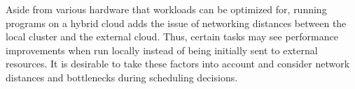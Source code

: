 \begin{description}[style=nextline]
    \item [Optimized Scheduling]
    Aside from various hardware that workloads can be optimized for, running programs on a hybrid cloud adds the issue of networking distances between the local cluster and the external cloud. Thus, certain tasks may see performance improvements when run locally instead of being initially sent to external resources. It is desirable to take these factors into account and consider network distances and bottlenecks during scheduling decisions.

\end{description}
